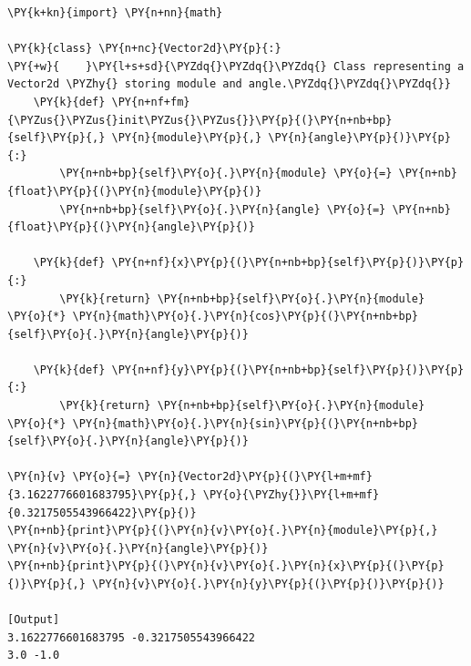 \begin{Verbatim}[label=\makebox{\url{https://github.com/lucabaldini/cmepda/tree/master/slides/latex/snippets/vector2d\_rtheta.py}},commandchars=\\\{\}]
\PY{k+kn}{import} \PY{n+nn}{math}

\PY{k}{class} \PY{n+nc}{Vector2d}\PY{p}{:}
\PY{+w}{    }\PY{l+s+sd}{\PYZdq{}\PYZdq{}\PYZdq{} Class representing a Vector2d \PYZhy{} storing module and angle.\PYZdq{}\PYZdq{}\PYZdq{}}   
    \PY{k}{def} \PY{n+nf+fm}{\PYZus{}\PYZus{}init\PYZus{}\PYZus{}}\PY{p}{(}\PY{n+nb+bp}{self}\PY{p}{,} \PY{n}{module}\PY{p}{,} \PY{n}{angle}\PY{p}{)}\PY{p}{:}
        \PY{n+nb+bp}{self}\PY{o}{.}\PY{n}{module} \PY{o}{=} \PY{n+nb}{float}\PY{p}{(}\PY{n}{module}\PY{p}{)}
        \PY{n+nb+bp}{self}\PY{o}{.}\PY{n}{angle} \PY{o}{=} \PY{n+nb}{float}\PY{p}{(}\PY{n}{angle}\PY{p}{)}
   
    \PY{k}{def} \PY{n+nf}{x}\PY{p}{(}\PY{n+nb+bp}{self}\PY{p}{)}\PY{p}{:}
        \PY{k}{return} \PY{n+nb+bp}{self}\PY{o}{.}\PY{n}{module} \PY{o}{*} \PY{n}{math}\PY{o}{.}\PY{n}{cos}\PY{p}{(}\PY{n+nb+bp}{self}\PY{o}{.}\PY{n}{angle}\PY{p}{)}
       
    \PY{k}{def} \PY{n+nf}{y}\PY{p}{(}\PY{n+nb+bp}{self}\PY{p}{)}\PY{p}{:}
        \PY{k}{return} \PY{n+nb+bp}{self}\PY{o}{.}\PY{n}{module} \PY{o}{*} \PY{n}{math}\PY{o}{.}\PY{n}{sin}\PY{p}{(}\PY{n+nb+bp}{self}\PY{o}{.}\PY{n}{angle}\PY{p}{)}
  
\PY{n}{v} \PY{o}{=} \PY{n}{Vector2d}\PY{p}{(}\PY{l+m+mf}{3.1622776601683795}\PY{p}{,} \PY{o}{\PYZhy{}}\PY{l+m+mf}{0.3217505543966422}\PY{p}{)}
\PY{n+nb}{print}\PY{p}{(}\PY{n}{v}\PY{o}{.}\PY{n}{module}\PY{p}{,} \PY{n}{v}\PY{o}{.}\PY{n}{angle}\PY{p}{)}
\PY{n+nb}{print}\PY{p}{(}\PY{n}{v}\PY{o}{.}\PY{n}{x}\PY{p}{(}\PY{p}{)}\PY{p}{,} \PY{n}{v}\PY{o}{.}\PY{n}{y}\PY{p}{(}\PY{p}{)}\PY{p}{)}

[Output]
3.1622776601683795 -0.3217505543966422
3.0 -1.0
\end{Verbatim}